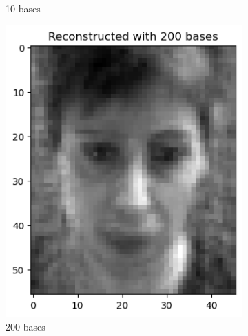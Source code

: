 \begin{figure}[htbp]
\begin{subfigure}[t]{0.2\linewidth}
		\caption{10 bases}
		\label{fig:test_re_10}
	\end{subfigure}
    \hfill
	\begin{subfigure}[t]{0.2\linewidth}
		\centering
		\includegraphics[width=\linewidth]{image/q1_recon_test_200.png}
		\caption{200 bases}
		\label{fig:test_re_200}
	\end{subfigure}
    \hfill
	\begin{subfigure}[t]{0.2\linewidth}
		\centering

\end{subfigure}
\end{figure}
